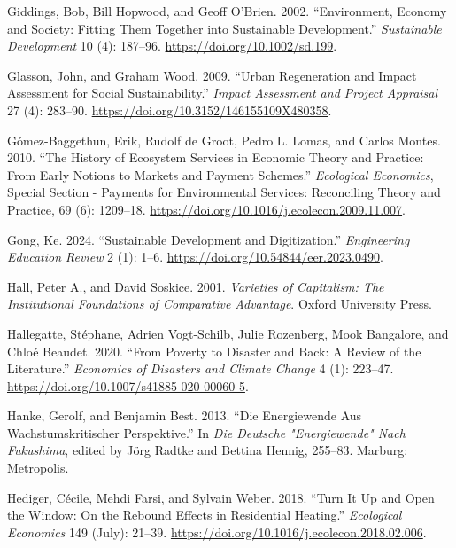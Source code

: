 \documentclass[
  a4paper,
  openany]{book}
\newlength{\cslhangindent}
\newenvironment{CSLReferences}[2] %
 {\begin{list}{}{%
  \setlength{\itemindent}{0pt}
  \setlength{\leftmargin}{0pt}
  \setlength{\parsep}{0pt}
  \ifodd #1
   \setlength{\leftmargin}{\cslhangindent}
   \setlength{\itemindent}{-1\cslhangindent}
  \fi
  \setlength{\itemsep}{#2\baselineskip}}}
 {\end{list}}
\begin{document}
\begin{CSLReferences}{1}{0}
Giddings, Bob, Bill Hopwood, and Geoff O'Brien. 2002. {``Environment,
Economy and Society: Fitting Them Together into Sustainable
Development.''} \emph{Sustainable Development} 10 (4): 187--96.
\url{https://doi.org/10.1002/sd.199}.

Glasson, John, and Graham Wood. 2009. {``Urban Regeneration and Impact
Assessment for Social Sustainability.''} \emph{Impact Assessment and
Project Appraisal} 27 (4): 283--90.
\url{https://doi.org/10.3152/146155109X480358}.

Gómez-Baggethun, Erik, Rudolf de Groot, Pedro L. Lomas, and Carlos
Montes. 2010. {``The History of Ecosystem Services in Economic Theory
and Practice: {From} Early Notions to Markets and Payment Schemes.''}
\emph{Ecological Economics}, Special {Section} - {Payments} for
{Environmental Services}: {Reconciling Theory} and {Practice}, 69 (6):
1209--18. \url{https://doi.org/10.1016/j.ecolecon.2009.11.007}.

Gong, Ke. 2024. {``Sustainable Development and Digitization.''}
\emph{Engineering Education Review} 2 (1): 1--6.
\url{https://doi.org/10.54844/eer.2023.0490}.

Hall, Peter A., and David Soskice. 2001. \emph{Varieties of
{Capitalism}: {The Institutional Foundations} of {Comparative
Advantage}}. Oxford University Press.

Hallegatte, Stéphane, Adrien Vogt-Schilb, Julie Rozenberg, Mook
Bangalore, and Chloé Beaudet. 2020. {``From {Poverty} to {Disaster} and
{Back}: A {Review} of the {Literature}.''} \emph{Economics of Disasters
and Climate Change} 4 (1): 223--47.
\url{https://doi.org/10.1007/s41885-020-00060-5}.

Hanke, Gerolf, and Benjamin Best. 2013. {``Die {Energiewende} Aus
Wachstumskritischer {Perspektive}.''} In \emph{Die Deutsche
"{Energiewende}" Nach {Fukushima}}, edited by Jörg Radtke and Bettina
Hennig, 255--83. Marburg: Metropolis.

Hediger, Cécile, Mehdi Farsi, and Sylvain Weber. 2018. {``Turn {It Up}
and {Open} the {Window}: {On} the {Rebound Effects} in {Residential
Heating}.''} \emph{Ecological Economics} 149 (July): 21--39.
\url{https://doi.org/10.1016/j.ecolecon.2018.02.006}.


\end{CSLReferences}
\end{document}
